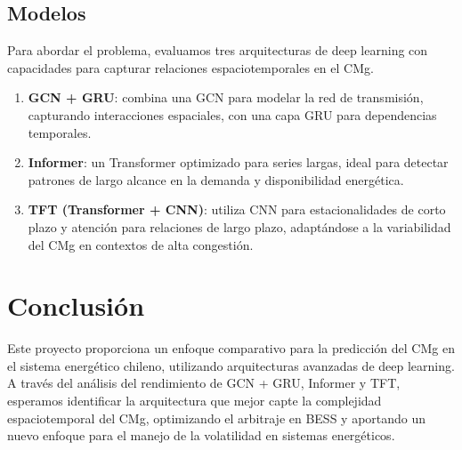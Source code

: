 \documentclass[twocolumn]{article}
\begin{document}
\subsection{Modelos}
Para abordar el problema, evaluamos tres arquitecturas de deep learning con capacidades para capturar relaciones espaciotemporales en el CMg.
\begin{enumerate}
    \item \textbf{GCN + GRU}: combina una GCN para modelar la red de transmisión, capturando interacciones espaciales, con una capa GRU para dependencias temporales.
    \item \textbf{Informer}: un Transformer optimizado para series largas, ideal para detectar patrones de largo alcance en la demanda y disponibilidad energética.
    \item \textbf{TFT (Transformer + CNN)}: utiliza CNN para estacionalidades de corto plazo y atención para relaciones de largo plazo, adaptándose a la variabilidad del CMg en contextos de alta congestión.
\end{enumerate}

\section{Conclusión}
Este proyecto proporciona un enfoque comparativo para la predicción del CMg en el sistema energético chileno, utilizando arquitecturas avanzadas de deep learning. A través del análisis del rendimiento de GCN + GRU, Informer y TFT, esperamos identificar la arquitectura que mejor capte la complejidad espaciotemporal del CMg, optimizando el arbitraje en BESS y aportando un nuevo enfoque para el manejo de la volatilidad en sistemas energéticos.
\end{document}
